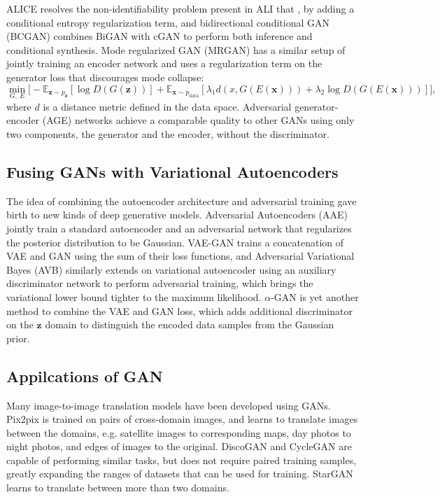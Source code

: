 ALICE \cite{li2017alice} resolves the non-identifiability problem present in ALI that , by adding a conditional entropy regularization term, and bidirectional conditional GAN (BCGAN) \cite{jaiswal2017bcgan} combines BiGAN with cGAN to perform both inference and conditional synthesis.
Mode regularized GAN (MRGAN) \cite{che2016mrgan} has a similar setup of jointly training an encoder network and uses a regularization term on the generator loss that discourages mode collapse:
\begin{equation}\label{eqn:mrgan}
\min_{G,~E} \Big[ - \mathbb{E}_{\bm{z} \sim p_{\bm{z}}} [ \log  D(G(\bm{z})) ]
+ \mathbb{E}_{\bm{x} \sim p_{\mathrm{data}}} [ \lambda_1 d(x, G(E(\bm{x}))) + \lambda_2 \log D(G(E(\bm{x}))) ] \Big],
\end{equation}
where $d$ is a distance metric defined in the data space.
Adversarial generator-encoder (AGE) networks \cite{ulyanov2017age} achieve a comparable quality to other GANs using only two components, the generator and the encoder, without the discriminator.


\subsection{Fusing GANs with Variational Autoencoders}

The idea of combining the autoencoder architecture and adversarial training gave birth to new kinds of deep generative models.
Adversarial Autoencoders (AAE) \cite{makhzani2015aae} jointly train a standard autoencoder and an adversarial network that regularizes the posterior distribution to be Gaussian.
VAE-GAN \cite{larsen2015vaegan} trains a concatenation of VAE and GAN using the sum of their loss functions, and Adversarial Variational Bayes (AVB) \cite{mescheder2017adversarial} similarly extends on variational autoencoder using an auxiliary discriminator network to perform adversarial training, which brings the variational lower bound tighter to the maximum likelihood.
$\alpha$-GAN \cite{rosca2017alphagan} is yet another method to combine the VAE and GAN loss, which adds additional discriminator on the $\bm{z}$ domain to distinguish the encoded data samples from the Gaussian prior.


\subsection{Appilcations of GAN}

Many image-to-image translation models have been developed using GANs. Pix2pix \cite{isola2016pix2pix} is trained on pairs of cross-domain images, and learns to translate images between the domains, e.g. satellite images to corresponding maps, day photos to night photos, and edges of images to the original.
DiscoGAN and CycleGAN \cite{kim2017discogan, zhu2017cyclegan} are capable of performing similar tasks, but does not require paired training samples, greatly expanding the ranges of datasets that can be used for training.
StarGAN \cite{choi2017stargan} learns to translate between more than two domains.

